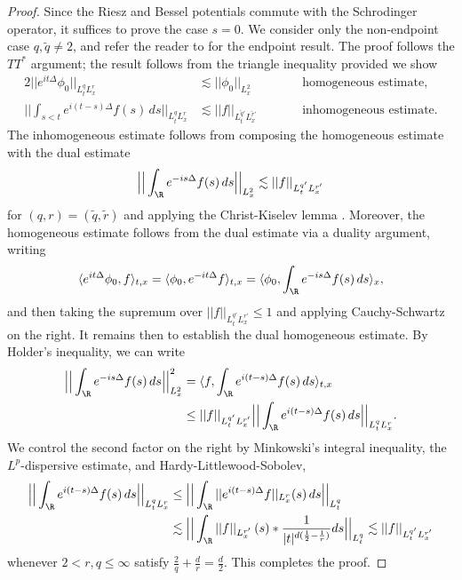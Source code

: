 \documentclass[reqno]{amsart}
\theoremstyle{definition}
\theoremstyle{remark}
\begin{document}
\begin{proof}
	Since the Riesz and Bessel potentials commute with the Schrodinger operator, it suffices to prove the case $s = 0$. We consider only the non-endpoint case $q, \widetilde q \neq 2$, and refer the reader to \cite{KeelTao} for the endpoint result. The proof follows the $TT^*$ argument; the result follows from the triangle inequality provided we show
	\begin{alignat*}{2}
		||e^{i t \Delta} \phi_0||_{L^q_t L^r_x} 
			&\lesssim ||\phi_0||_{L^2_x}
			&&\qquad \text{homogeneous estimate,} \\
		\Big|\Big| \int_{s< t} e^{ i (t - s) \Delta} f(s) \, ds \Big|\Big|_{L^{q}_t L^{r}_x} 
			&\lesssim ||f||_{L^{\widetilde q'}_t L^{\widetilde r'}_x}
			&&\qquad \text{inhomogeneous estimate}.
	\end{alignat*}	
	The inhomogeneous estimate follows from composing the homogeneous estimate with the dual estimate
		\[ \Big|\Big| \int_\R e^{- i s \Delta} f(s) \, ds \Big|\Big|_{L^2_x} \lesssim ||f||_{L^{q'}_t L^{r'}_x} \]
	for $(q, r) = (\widetilde q, \widetilde r)$ and applying the Christ-Kiselev lemma \cite{ChristKiselev}. Moreover, the homogeneous estimate follows from the dual estimate via a duality argument, writing
		\[ \langle e^{it \Delta} \phi_0, f \rangle_{t, x} = \langle \phi_0, e^{-it \Delta} f\rangle_{t, x} = \langle \phi_0, \int_\R e^{-i s \Delta} f(s)\, ds \rangle_x, \]
	and then taking the supremum over $||f||_{L^{q'}_t L^{r'}_x} \leq 1$ and applying Cauchy-Schwartz on the right. It remains then to establish the dual homogeneous estimate. By Holder's inequality, we can write
	\begin{align*}
		\Big|\Big| \int_\R e^{- i s \Delta} f(s) \, ds \Big|\Big|_{L^2_x}^2 
			&= \langle f, \int_\R e^{i (t - s) \Delta} f(s) \, ds \rangle_{t, x}\\
			&\leq ||f||_{L^{q'}_t L^{r'}_x} \Big|\Big| \int_\R e^{i (t - s) \Delta} f(s) \, ds \Big|\Big|_{L^q_t L^r_x}.
	\end{align*}
	We control the second factor on the right by Minkowski's integral inequality, the $L^p$-dispersive estimate, and Hardy-Littlewood-Sobolev, 
		\begin{align*}
			 \Big|\Big| \int_\R e^{i (t - s) \Delta} f(s) \, ds \Big|\Big|_{L^q_t L^r_x}
			 	&\leq  \Big|\Big| \int_\R || e^{i (t - s) \Delta} f||_{L^r_x}(s) \, ds \Big|\Big|_{L^q_t}\\
			 	&\lesssim \Big|\Big| \int_\R || f||_{L^{r'}_x} \, (s) * \frac{1}{|t|^{d (\frac12 - \frac1r)}} ds \Big|\Big|_{L^q_t} \lesssim ||f||_{L^{q'}_t L^{r'}_x}
		\end{align*}
	whenever $2 < r, q\leq \infty$ satisfy $\tfrac2q + \tfrac{d}{r} = \tfrac{d}{2}$. This completes the proof. 
\end{proof}
\end{document}

